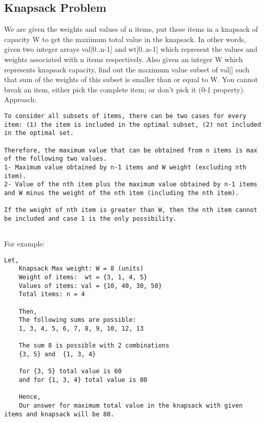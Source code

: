 \documentclass[12pt]{article}
\begin{document}
	\subsection{Knapsack Problem}
	We are given the weights and values of n items, put these items in a knapsack of capacity W to get the maximum total value in the knapsack. In other words, given two integer arrays val[0..n-1] and wt[0..n-1] which represent the values and weights associated with n items respectively. Also given an integer W which represents knapsack capacity, find out the maximum value subset of val[] such that sum of the weights of this subset is smaller than or equal to W. You cannot break an item, either pick the complete item; or don’t pick it (0-1 property).\\
    Approach:
	\begin{lstlisting}[numbers=none, frame=none]
To consider all subsets of items, there can be two cases for every item: (1) the item is included in the optimal subset, (2) not included in the optimal set.

Therefore, the maximum value that can be obtained from n items is max of the following two values.
1- Maximum value obtained by n-1 items and W weight (excluding nth item).
2- Value of the nth item plus the maximum value obtained by n-1 items and W minus the weight of the nth item (including the nth item).

If the weight of nth item is greater than W, then the nth item cannot be included and case 1 is the only possibility.
   
	\end{lstlisting}
	
	For example:
	\begin{lstlisting}[numbers=none, frame=none]
	Let,
	Knapsack Max weight: W = 8 (units)
    Weight of items:  wt = {3, 1, 4, 5}
    Values of items: val = {10, 40, 30, 50}
    Total items: n = 4
    
    Then,
    The following sums are possible:
    1, 3, 4, 5, 6, 7, 8, 9, 10, 12, 13
    
    The sum 8 is possible with 2 combinations
    {3, 5} and  {1, 3, 4}
    
    for {3, 5} total value is 60
    and for {1, 3, 4} total value is 80
    
    Hence,
    Our answer for maximum total value in the knapsack with given items and knapsack will be 80.
    \end{lstlisting}
    \newpage
\end{document}
